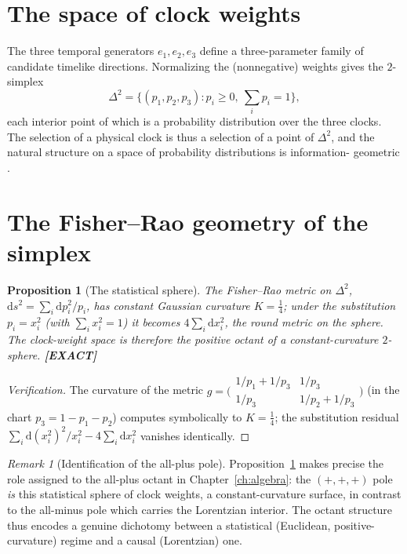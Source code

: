 \documentclass[11pt,oneside]{book}
\newcommand{\dd}{\mathrm{d}}
\newcommand{\status}[1]{{\sffamily\bfseries\color{statuscol}[#1]}}
\theoremstyle{plain}
\newtheorem{proposition}[theorem]{Proposition}
\theoremstyle{definition}
\theoremstyle{remark}
\newtheorem{remark}[theorem]{Remark}
\begin{document}
\section{The space of clock weights}
\label{sec:clock-weights}

The three temporal generators $e_1,e_2,e_3$ define a three-parameter family of
candidate timelike directions. Normalizing the (nonnegative) weights gives the
$2$-simplex
\[
  \Delta^2=\{(p_1,p_2,p_3):p_i\ge0,\ \textstyle\sum_i p_i=1\},
\]
each interior point of which is a probability distribution over the three clocks.
The selection of a physical clock is thus a selection of a point of $\Delta^2$, and
the natural structure on a space of probability distributions is information-
geometric \cite{Rao1945,Amari1985,AmariNagaoka2000}.

\section{The Fisher--Rao geometry of the simplex}
\label{sec:fisher-rao}

\begin{proposition}[The statistical sphere]
\label{prop:fisher}
The Fisher--Rao metric on $\Delta^2$,
$\dd s^2=\sum_i \dd p_i^2/p_i$, has constant Gaussian curvature $K=\tfrac14$; under
the substitution $p_i=x_i^2$ (with $\sum_i x_i^2=1$) it becomes $4\sum_i \dd x_i^2$,
the round metric on the sphere. The clock-weight space is therefore the positive
octant of a constant-curvature $2$-sphere. \status{EXACT}
\end{proposition}

\begin{proof}[Verification]
The curvature of the metric $g=\big(\begin{smallmatrix}1/p_1+1/p_3 & 1/p_3\\
1/p_3 & 1/p_2+1/p_3\end{smallmatrix}\big)$ (in the chart $p_3=1-p_1-p_2$) computes
symbolically to $K=\tfrac14$; the substitution residual $\sum_i \dd(x_i^2)^2/x_i^2
-4\sum_i \dd x_i^2$ vanishes identically.
\end{proof}

\begin{remark}[Identification of the all-plus pole]
Proposition~\ref{prop:fisher} makes precise the role assigned to the all-plus
octant in Chapter~\ref{ch:algebra}: the $(+,+,+)$ pole \emph{is} this statistical
sphere of clock weights, a constant-curvature surface, in contrast to the all-minus
pole which carries the Lorentzian interior. The octant structure thus encodes a
genuine dichotomy between a statistical (Euclidean, positive-curvature) regime and
a causal (Lorentzian) one.
\end{remark}
\end{document}
